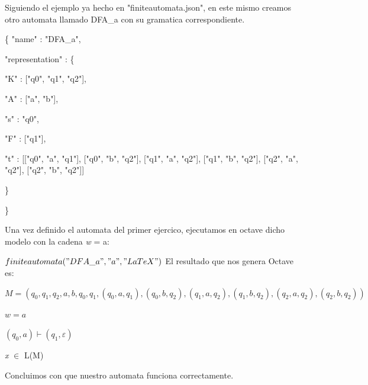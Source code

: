 \documentclass{article}
\begin{document}
Siguiendo el  ejemplo ya hecho en "finiteautomata.json", en este mismo creamos otro automata llamado DFA\_a con su gramatica correspondiente.

\{
    "name" : "DFA\_a",
    
    "representation" : \{
    
      "K" : ["q0", "q1", "q2"],
      
      "A" : ["a", "b"],
      
      "s" : "q0",
      
      "F" : ["q1"],
      
      "t" : [["q0", "a", "q1"],
             ["q0", "b", "q2"],
             ["q1", "a", "q2"],
             ["q1", "b", "q2"],
	     ["q2", "a", "q2"],
             ["q2", "b", "q2"]]
             
      \}
      
  \}
  
  
Una vez definido el automata del primer ejercico, ejecutamos en octave dicho modelo con la cadena \emph w = a:


	\centering
	$finiteautomata("DFA\_a", "a", "LaTeX")$
	\flushleft
El resultado que nos genera Octave es:

$M = ( {q_0, q_1, q_2}, {a, b}, q_0, {q_1}, {(q_0, a, q_1), (q_0, b, q_2), (q_1, a, q_2), (q_1, b, q_2), (q_2, a, q_2), (q_2, b, q_2)} )$

$w = a$

$(q_0, a) \vdash (q_1, \varepsilon)$

\emph x $\in$ L(M)



Concluimos con que nuestro automata funciona correctamente.
\end{document}
